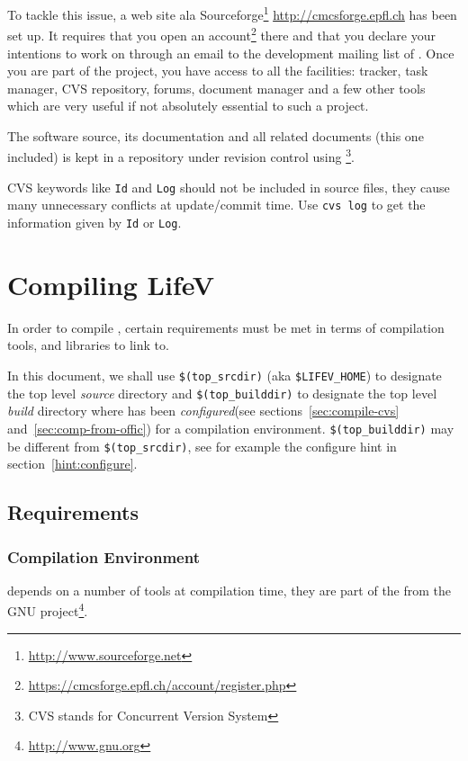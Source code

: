 To tackle this issue, a web site ala Sourceforge\footnote{\url{http://www.sourceforge.net}} \url{http://cmcsforge.epfl.ch} has been set up. It requires that you open an account\footnote{\url{https://cmcsforge.epfl.ch/account/register.php}} there and that you declare your intentions to work on \lifev through an email to the development mailing list of \lifev. Once you are part of the project, you have access to all the facilities: tracker, task manager, CVS repository, forums, document manager and a few other tools which are very useful if not absolutely essential to such a project.


The software source, its documentation and all related documents (this
one included) is kept in a repository under revision control
using \footnote{CVS
  stands for Concurrent Version System}.

CVS keywords like \verb!Id! and \verb!Log! should not be included in source files,
they cause many unnecessary conflicts at update/commit time. Use 
\verb!cvs log! to get the information given by \verb!Id! or \verb!Log!.

\section{Compiling LifeV}
\label{compile-lifev} 

In order to compile \lifev, certain requirements must be met in terms
of compilation tools, and libraries to link to.

\noindent In this document, we shall use \verb+$(top_srcdir)+ (aka \verb+$LIFEV_HOME+) to designate the top level \emph{source} directory 
and \verb+$(top_builddir)+ to designate the top level \emph{build}
directory where \lifev has been \emph{configured}(see
sections~\ref{sec:compile-cvs} and~\ref{sec:comp-from-offic}) for a
compilation environment.  \verb+$(top_builddir)+ may be different from
\verb+$(top_srcdir)+, see for example the configure hint in
section~\ref{hint:configure}.

\subsection{Requirements}

\subsubsection{Compilation Environment}
\label{sec:comp-envir}

\lifev depends on a number of tools at compilation time, they are part
of the  from the GNU
project\footnote{\url{http://www.gnu.org}}. 

